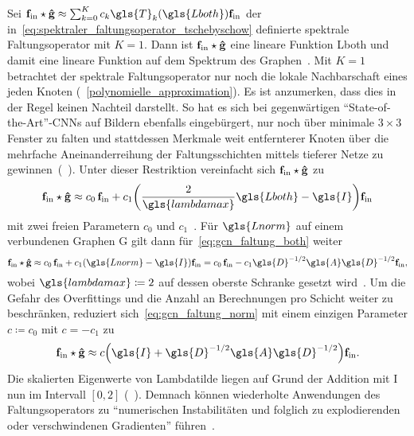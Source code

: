 Sei $\ve{f}_{\mathrm{in}} \star \ve{\hat g} \approx \sum_{k=0}^K c_k \gls{T}_k\left(\gls{Lboth}\right) \ve{f}_{\mathrm{in}}$ der in~\eqref{eq:spektraler_faltungsoperator_tschebyschow} definierte spektrale Faltungsoperator mit $K=1$.
Dann ist $\mathbf{f}_{\mathrm{in}} \star \mathbf{\hat g}$ eine lineare Funktion \bzgl{} \gls{Lboth} und damit eine lineare Funktion auf dem Spektrum des Graphen~\cite{gcn}.
Mit $K=1$ betrachtet der spektrale Faltungsoperator nur noch die lokale Nachbarschaft eines jeden Knoten (\vgl{}~\ref{polynomielle_approximation}).
Es ist anzumerken, dass dies in der Regel keinen Nachteil darstellt.
So hat es sich bei gegenwärtigen \enquote{State-of-the-Art}-\glspl{CNN} auf Bildern ebenfalls eingebürgert, nur noch über minimale $3\times3$ Fenster zu falten und stattdessen Merkmale weit entfernterer Knoten über die mehrfache Aneinanderreihung der Faltungsschichten mittels tieferer Netze zu gewinnen~(\vgl{}~\cite{gcn, vgg, He}).
Unter dieser Restriktion vereinfacht sich $\mathbf{f}_{\mathrm{in}} \star \mathbf{\hat g}$ zu
\begin{equation}
  \ve{f}_{\mathrm{in}} \star \ve{\hat g} \approx c_0\, \ve{f}_{\mathrm{in}} + c_1 \left(\frac{2}{\gls{lambdamax}}\gls{Lboth} - \gls{I}\right)\ve{f}_{\mathrm{in}}
  \label{eq:gcn_faltung_both}
\end{equation}
mit zwei freien Parametern $c_0$ und $c_1$~\cite{gcn}.
Für $\gls{Lnorm}$ auf einem verbundenen Graphen \gls{G} gilt dann für~\eqref{eq:gcn_faltung_both} weiter
\begin{equation}
  \ve{f}_{\mathrm{in}} \star \ve{\hat g} \approx c_0 \, \ve{f}_{\mathrm{in}} + c_1 \left(\gls{Lnorm} - \gls{I}\right)\ve{f}_{\mathrm{in}} = c_0 \, \ve{f}_{\mathrm{in}} - c_1 \gls{D}^{-1/2} \gls{A} \gls{D}^{-1/2} \ve{f}_{\mathrm{in}},
  \label{eq:gcn_faltung_norm}
\end{equation}
wobei $\gls{lambdamax} \coloneqq 2$ auf dessen oberste Schranke gesetzt wird~\cite{gcn}.
Um die Gefahr des Overfittings und die Anzahl an Berechnungen pro Schicht weiter zu beschränken, reduziert sich~\eqref{eq:gcn_faltung_norm} mit einem einzigen Parameter $c \coloneqq c_0$ mit $c = -c_1$ zu~\cite{gcn}
\begin{equation*}
  \ve{f}_{\mathrm{in}} \star \ve{\hat g} \approx c \left(\gls{I} + \gls{D}^{-1/2} \gls{A} \gls{D}^{-1/2} \right) \ve{f}_{\mathrm{in}}.
\end{equation*}
Die skalierten Eigenwerte von \gls{Lambdatilde} liegen auf Grund der Addition mit \gls{I} nun im Intervall $\left[0, 2\right]$ (\vgl{}~\cite{gcn}).
Demnach können wiederholte Anwendungen des Faltungsoperators zu \enquote{numerischen Instabilitäten und folglich zu explodierenden oder verschwindenen Gradienten} führen~\cite{gcn}.
